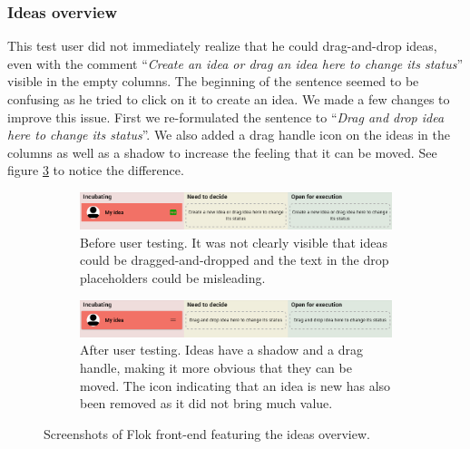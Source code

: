 \documentclass[a4paper,12pt,twoside]{article}
\begin{document}



\subsubsection*{Ideas overview}
This test user did not immediately realize that he could drag-and-drop ideas, even with the comment “\emph{Create an idea or drag an idea here to change its status}” visible in the empty columns.
The beginning of the sentence seemed to be confusing as he tried to click on it to create an idea.
We made a few changes to improve this issue.
First we re-formulated the sentence to “\emph{Drag and drop idea here to change its status}”.
We also added a drag handle icon on the ideas in the columns as well as a shadow to increase the feeling that it can be moved.
See figure \ref{fig.tests.ideasOverview} to notice the difference.

\begin{figure}[!htb]
    \begin{subfigure}[t]{\textwidth}
        \includegraphics[width=\textwidth]{images/user_tests/ideasOverview_before.png}
        \caption{Before user testing. It was not clearly visible that ideas could be dragged-and-dropped and the text in the drop placeholders could be misleading.}
        \label{fig.tests.ideasOverview.before}
    \end{subfigure}
    \begin{subfigure}[t]{\textwidth}
        \includegraphics[width=\textwidth]{images/user_tests/ideasOverview_after.png}
        \caption{After user testing. Ideas have a shadow and a drag handle, making it more obvious that they can be moved. The icon indicating that an idea is new has also been removed as it did not bring much value.}
        \label{fig.tests.ideasOverview.after}
    \end{subfigure}
    \caption{Screenshots of Flok front-end featuring the ideas overview.}
    \label{fig.tests.ideasOverview}
\end{figure}
\end{document}
